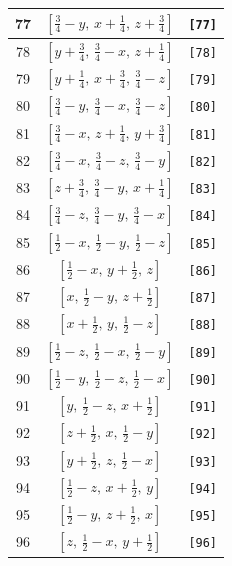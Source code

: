\documentclass[fleqn,8pt]{jsarticle}
\begin{document}
\begin{longtable}{ccc}
77 & $\left[ \frac{3}{4} - y,\, x + \frac{1}{4},\, z + \frac{3}{4} \right]$ & {\tt [77]} \\ \hline
78 & $\left[ y + \frac{3}{4},\, \frac{3}{4} - x,\, z + \frac{1}{4} \right]$ & {\tt [78]} \\ \hline
79 & $\left[ y + \frac{1}{4},\, x + \frac{3}{4},\, \frac{3}{4} - z \right]$ & {\tt [79]} \\ \hline
80 & $\left[ \frac{3}{4} - y,\, \frac{3}{4} - x,\, \frac{3}{4} - z \right]$ & {\tt [80]} \\ \hline
81 & $\left[ \frac{3}{4} - x,\, z + \frac{1}{4},\, y + \frac{3}{4} \right]$ & {\tt [81]} \\ \hline
82 & $\left[ \frac{3}{4} - x,\, \frac{3}{4} - z,\, \frac{3}{4} - y \right]$ & {\tt [82]} \\ \hline
83 & $\left[ z + \frac{3}{4},\, \frac{3}{4} - y,\, x + \frac{1}{4} \right]$ & {\tt [83]} \\ \hline
84 & $\left[ \frac{3}{4} - z,\, \frac{3}{4} - y,\, \frac{3}{4} - x \right]$ & {\tt [84]} \\ \hline
85 & $\left[ \frac{1}{2} - x,\, \frac{1}{2} - y,\, \frac{1}{2} - z \right]$ & {\tt [85]} \\ \hline
86 & $\left[ \frac{1}{2} - x,\, y + \frac{1}{2},\, z \right]$ & {\tt [86]} \\ \hline
87 & $\left[ x,\, \frac{1}{2} - y,\, z + \frac{1}{2} \right]$ & {\tt [87]} \\ \hline
88 & $\left[ x + \frac{1}{2},\, y,\, \frac{1}{2} - z \right]$ & {\tt [88]} \\ \hline
89 & $\left[ \frac{1}{2} - z,\, \frac{1}{2} - x,\, \frac{1}{2} - y \right]$ & {\tt [89]} \\ \hline
90 & $\left[ \frac{1}{2} - y,\, \frac{1}{2} - z,\, \frac{1}{2} - x \right]$ & {\tt [90]} \\ \hline
91 & $\left[ y,\, \frac{1}{2} - z,\, x + \frac{1}{2} \right]$ & {\tt [91]} \\ \hline
92 & $\left[ z + \frac{1}{2},\, x,\, \frac{1}{2} - y \right]$ & {\tt [92]} \\ \hline
93 & $\left[ y + \frac{1}{2},\, z,\, \frac{1}{2} - x \right]$ & {\tt [93]} \\ \hline
94 & $\left[ \frac{1}{2} - z,\, x + \frac{1}{2},\, y \right]$ & {\tt [94]} \\ \hline
95 & $\left[ \frac{1}{2} - y,\, z + \frac{1}{2},\, x \right]$ & {\tt [95]} \\ \hline
96 & $\left[ z,\, \frac{1}{2} - x,\, y + \frac{1}{2} \right]$ & {\tt [96]} \\
\end{longtable}
\end{document}

